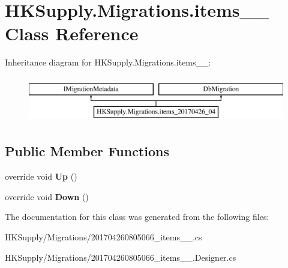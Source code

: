 \hypertarget{class_h_k_supply_1_1_migrations_1_1items__20170426__04}{}\section{H\+K\+Supply.\+Migrations.\+items\+\_\+\_ Class Reference}
\label{class_h_k_supply_1_1_migrations_1_1items__20170426__04}
Inheritance diagram for H\+K\+Supply.\+Migrations.\+items\+\_\+\_\+:\begin{figure}[H]
\begin{center}
\leavevmode
\includegraphics[height=2.000000cm]{class_h_k_supply_1_1_migrations_1_1items__20170426__04}
\end{center}
\end{figure}
\subsection*{Public Member Functions}
\begin{DoxyCompactItemize}
\item 
\mbox{\label{class_h_k_supply_1_1_migrations_1_1items__20170426__04_ab73ac91c1f01ddc2fd37f447182764eb}} 
override void {\bfseries Up} ()
\item 
\mbox{\label{class_h_k_supply_1_1_migrations_1_1items__20170426__04_ab9595075411bf716a1ad982d38887b61}} 
override void {\bfseries Down} ()
\end{DoxyCompactItemize}


The documentation for this class was generated from the following files\+:\begin{DoxyCompactItemize}
\item 
H\+K\+Supply/\+Migrations/201704260805066\+\_\+items\+\_\+\_.\+cs\item 
H\+K\+Supply/\+Migrations/201704260805066\+\_\+items\+\_\+\_.\+Designer.\+cs\end{DoxyCompactItemize}
